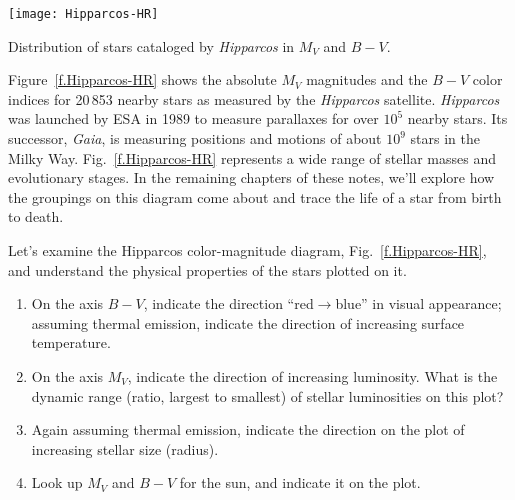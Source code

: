 \begin{marginfigure}
\texttt{[image: Hipparcos-HR]}
\caption[Hipparcos color-magnitude diagram]{\label{f.Hipparcos-HR} Distribution of stars cataloged by \emph{Hipparcos} in $M_{V}$ and $B-V$.}
\end{marginfigure}
Figure~\ref{f.Hipparcos-HR} shows the absolute $M_{V}$ magnitudes and the $B-V$ color indices for 20\,853 nearby stars as measured by the \emph{Hipparcos} satellite\cite{Perryman1997The-Hipparcos-C}. \emph{Hipparcos} was launched by ESA in 1989 to measure parallaxes for over $10^{5}$ nearby stars. Its successor, \emph{Gaia}, is measuring positions and motions of about $10^{9}$ stars in the Milky Way. Fig.~\ref{f.Hipparcos-HR} represents a wide range of stellar masses and evolutionary stages. In the remaining chapters of these notes, we'll explore how the groupings on this diagram come about and trace the life of a star from birth to death.

\begin{exercisebox}
Let's examine the Hipparcos color-magnitude diagram, Fig.~\ref{f.Hipparcos-HR}, and understand the physical properties of the stars plotted on it.
\begin{enumerate}
\item On the axis $B-V$, indicate the direction ``red$\to$blue'' in visual appearance; assuming  thermal emission, indicate the direction of increasing surface temperature.
\item On the axis $M_{V}$, indicate the direction of increasing luminosity. What is the dynamic range (ratio, largest to smallest) of stellar luminosities on this plot?
\item Again assuming thermal emission, indicate the direction on the plot of increasing stellar size (radius).
\item Look up $M_{V}$ and $B-V$ for the sun, and indicate it on the plot.
\end{enumerate}
\end{exercisebox}
